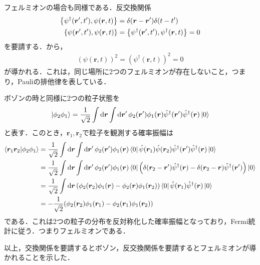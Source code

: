 \documentclass{report}
\begin{document}
フェルミオンの場合も同様である．反交換関係
\begin{align}
  \qty{\psi^{\dagger}(\bm{r}',t'),\psi(\bm{r},t)} &= \delta(\bm{r} - \bm{r}')\delta(t - t')\\
  \qty{\psi(\bm{r}',t'),\psi(\bm{r},t)} &= \qty{\psi^{\dagger}(\bm{r}',t'),\psi^{\dagger}(\bm{r},t)} = 0 \label{fermion-com-same}
\end{align}
を要請する．から，
\begin{align}
  (\psi(\bm{r},t))^2 = (\psi^{\dagger}(\bm{r},t))^2 = 0
\end{align}
が導かれる．これは，同じ場所に2つのフェルミオンが存在しないこと，つまり，Pauliの排他律を表している．

ボゾンの時と同様に2つの粒子状態を
\begin{align}
  \ket{\phi_2\phi_1} = \frac{1}{\sqrt{2}}\int\dd{\bm{r}}\int\dd{\bm{r}'} \phi_2(\bm{r}')\phi_1(\bm{r}) \hat{\psi}^{\dagger}(\bm{r}')\hat{\psi}^{\dagger}(\bm{r}) \ket{0}
\end{align}
と表す．このとき，$\bm{r}_1,\bm{r}_2$で粒子を観測する確率振幅は
\begin{align}
  \bra{\bm{r}_1\bm{r}_2}\ket{\phi_2\phi_1} &= \frac{1}{\sqrt{2}}\int\dd{\bm{r}}\int\dd{\bm{r}'}\phi_2(\bm{r}')\phi_1(\bm{r})\bra{0}\hat{\psi}(\bm{r}_1)\hat{\psi}(\bm{r}_2)\hat{\psi}^{\dagger}(\bm{r}')\hat{\psi}^{\dagger}(\bm{r}) \ket{0}\\
  &= \frac{1}{\sqrt{2}}\int\dd{\bm{r}}\int\dd{\bm{r}'}\phi_2(\bm{r}')\phi_1(\bm{r})\bra{0}\qty(\delta(\bm{r}_2 - \bm{r}')\hat{\psi}^{\dagger}(\bm{r}) - \delta(\bm{r}_2 - \bm{r})\hat{\psi}^{\dagger}(\bm{r}')) \ket{0}\\
  &= \frac{1}{\sqrt{2}}\int\dd{\bm{r}}\qty(\phi_2(\bm{r}_2)\phi_1(\bm{r}) - \phi_2(\bm{r})\phi_1(\bm{r}_2))\bra{0}\hat{\psi}(\bm{r}_1)\hat{\psi}^{\dagger}(\bm{r})\ket{0}\\
  &= -\frac{1}{\sqrt{2}}\qty(\phi_2(\bm{r}_2)\phi_1(\bm{r}_1) - \phi_2(\bm{r}_1)\phi_1(\bm{r}_2))
\end{align}
である．これは2つの粒子の分布を反対称化した確率振幅となっており，Fermi統計に従う．つまりフェルミオンである．

以上，交換関係を要請するとボゾン，反交換関係を要請するとフェルミオンが導かれることを示した．
\end{document}
